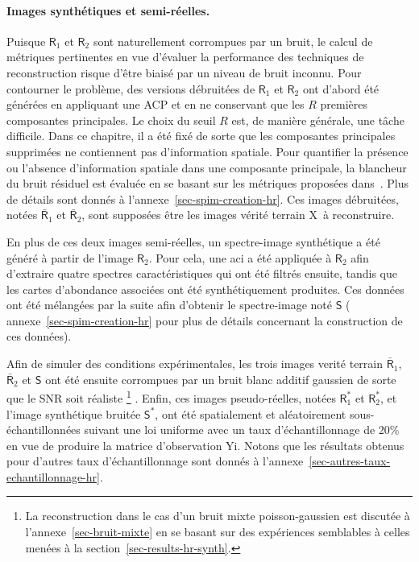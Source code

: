 \paragraph{Images synthétiques et semi-réelles.} Puisque $\mathsf{R}_1$ et $\mathsf{R}_2$ sont naturellement corrompues par un bruit, le calcul de métriques pertinentes en vue d'évaluer la performance des techniques de reconstruction risque d'être biaisé par un niveau de bruit inconnu. Pour contourner le problème, des versions débruitées de $\mathsf{R}_1$ et $\mathsf{R}_2$ ont d'abord été générées en appliquant une ACP et en ne conservant que les $R$ premières composantes principales. Le choix du seuil $R$ est, de manière générale, une tâche difficile. Dans ce chapitre, il a été fixé de sorte que les composantes principales supprimées ne contiennent pas d'information spatiale. Pour quantifier la présence ou l’absence d’information spatiale dans une composante principale, la blancheur du bruit résiduel est évaluée en se basant sur les métriques proposées dans~\cite[chap. 3]{riot2018residual}. Plus de détails sont donnés à l'annexe~\ref{sec-spim-creation-hr}. Ces images débruitées, notées $\bar{\mathsf{R}}_1$ et $\bar{\mathsf{R}}_2$, sont supposées être les images vérité terrain \gls{X} à reconstruire.

En plus de ces deux images semi-réelles, un spectre-image synthétique a été généré à partir de l'image $\mathsf{R}_2$. Pour cela, une \gls{aci} a été appliquée à $\mathsf{R}_2$ afin d'extraire quatre spectres caractéristiques qui ont été filtrés ensuite, tandis que les cartes d'abondance associées ont été synthétiquement produites. Ces données ont été mélangées par la suite  afin d'obtenir le spectre-image noté $\mathsf{S}$ (\cf{} annexe~\ref{sec-spim-creation-hr} pour plus de détails concernant la construction de ces données).

Afin de simuler des conditions expérimentales, les trois images verité terrain $\bar{\mathsf{R}}_1$, $\bar{\mathsf{R}}_2$ et $\mathsf{S}$ ont été ensuite corrompues par un bruit blanc additif gaussien de sorte que le SNR soit réaliste%
%
\footnote{La reconstruction dans le cas d'un bruit mixte poisson-gaussien est discutée à l'annexe~\ref{sec-bruit-mixte} en se basant sur des expériences semblables à celles menées à la section~\ref{sec-results-hr-synth}.}%
%
. Enfin, ces images pseudo-réelles, notées $\mathsf{R}_1^*$ et $\mathsf{R}_2^*$, et l'image synthétique bruitée $\mathsf{S}^*$, ont été spatialement et aléatoirement sous-échantillonnées suivant une loi uniforme avec un taux d'échantillonnage de 20\% en vue de produire la matrice d'observation \gls{Yi}. Notons que les résultats obtenus pour d'autres taux d'échantillonnage sont donnés à l'annexe~\ref{sec-autres-taux-echantillonnage-hr}. 

